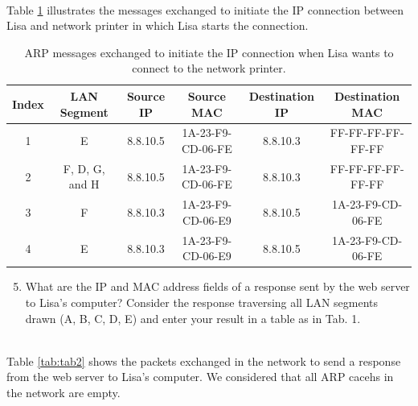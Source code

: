 \begin{tcolorbox}
    \mysolution{} \\
    Table \ref{tab:tab1} illustrates the messages exchanged to initiate the IP 
    connection between Lisa and network printer in which Lisa starts the connection.

\end{tcolorbox}

\begin{table}[H]
\label{tab:tab1}
    \caption{ARP messages exchanged to initiate the IP connection when Lisa wants to 
    connect to the network printer.}
\begin{tabular}{|c|c|c|c|c|c|}
\hline 
Index & LAN Segment    & Source IP & Source MAC        & Destination IP & Destination MAC   \\ \hline \hline
1     & E              & 8.8.10.5  & 1A-23-F9-CD-06-FE & 8.8.10.3       & FF-FF-FF-FF-FF-FF \\ \hline
2     & F, D, G, and H & 8.8.10.5  & 1A-23-F9-CD-06-FE & 8.8.10.3       & FF-FF-FF-FF-FF-FF \\ \hline
3     & F              & 8.8.10.3  & 1A-23-F9-CD-06-E9 & 8.8.10.5       & 1A-23-F9-CD-06-FE \\ \hline
4     & E              & 8.8.10.3  & 1A-23-F9-CD-06-E9 & 8.8.10.5       & 1A-23-F9-CD-06-FE \\ \hline
\end{tabular}
\end{table}


\begin{enumerate}
    \setcounter{enumi}{4}
    \item
    What are the IP and MAC address fields of a response sent by the web server to Lisa’s 
    computer? Consider the response traversing all LAN segments drawn (A, B, C, D, E) and 
    enter your result in a table as in Tab. 1.
\end{enumerate}

\begin{tcolorbox}
    \mysolution{}  \\
    Table \ref{tab:tab2} shows the packets exchanged in the network to send a response 
    from the web server to Lisa's computer. We considered that all ARP cacehs in the 
    network are empty.

\end{tcolorbox}


